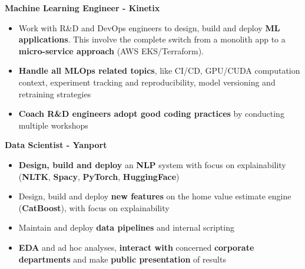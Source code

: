\documentclass[a4paper,10pt]{article}
\begin{document}
\begin{adjustbox}{valign=t}
\begin{minipage}{0.6\textwidth}
\begin{description}
                \normalsize
            \item[\normalfont \textcolor{ColorOne}{Oct. 2022 -- Oct. 2023}]
                \textbf{Machine Learning Engineer - Kinetix}\\
                \small
                \begin{itemize}[topsep=0pt]
                    \item Work with R\&D and DevOps engineers to design, build and deploy \textbf{ML applications}. This involve the complete switch from a monolith app to a \textbf{micro-service approach} (AWS EKS/Terraform).
                    \item \textbf{Handle all MLOps related topics}, like CI/CD, GPU/CUDA computation context, experiment tracking and reproducibility, model versioning and retraining strategies
                    \item \textbf{Coach R\&D engineers adopt good coding practices} by conducting multiple workshops
                \end{itemize}
                \normalsize
            \item[\normalfont \textcolor{ColorOne}{Sep. 2021 -- Sep. 2022}]
                \textbf{Data Scientist - Yanport}\\
                \small
                \begin{itemize}[topsep=0pt]
                    \item \textbf{Design, build and deploy} an \textbf{NLP} system with focus on explainability (\textbf{NLTK}, \textbf{Spacy}, \textbf{PyTorch}, \textbf{HuggingFace})
                    \item Design, build and deploy \textbf{new features} on the home value estimate engine (\textbf{CatBoost}), with focus on explainability
                    \item Maintain and deploy \textbf{data pipelines} and internal scripting
                    \item \textbf{EDA} and ad hoc analyses, \textbf{interact with} concerned \textbf{corporate departments} and make \textbf{public presentation} of results
                \end{itemize}
                \normalsize
        \end{description}
        \vspace{-1cm}

\end{minipage}
\end{adjustbox}
\end{document}
